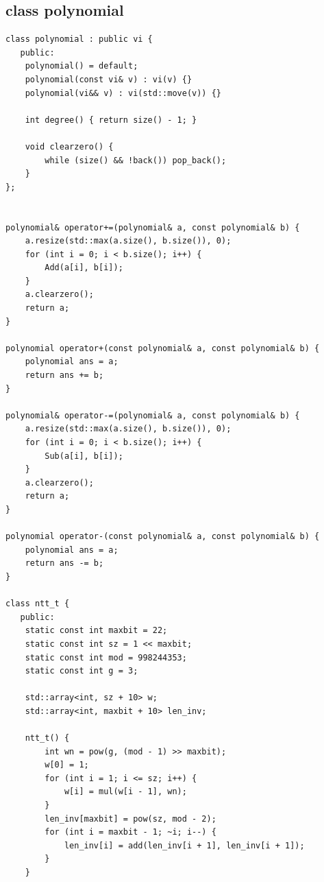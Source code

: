 \documentclass[UTF8, a4paper, titlepage, twoside]{ctexart}
\begin{document}
\subsection{ class polynomial }

\begin{lstlisting}[style=cpp]
class polynomial : public vi {
   public:
    polynomial() = default;
    polynomial(const vi& v) : vi(v) {}
    polynomial(vi&& v) : vi(std::move(v)) {}

    int degree() { return size() - 1; }

    void clearzero() {
        while (size() && !back()) pop_back();
    }
};


polynomial& operator+=(polynomial& a, const polynomial& b) {
    a.resize(std::max(a.size(), b.size()), 0);
    for (int i = 0; i < b.size(); i++) {
        Add(a[i], b[i]);
    }
    a.clearzero();
    return a;
}

polynomial operator+(const polynomial& a, const polynomial& b) {
    polynomial ans = a;
    return ans += b;
}

polynomial& operator-=(polynomial& a, const polynomial& b) {
    a.resize(std::max(a.size(), b.size()), 0);
    for (int i = 0; i < b.size(); i++) {
        Sub(a[i], b[i]);
    }
    a.clearzero();
    return a;
}

polynomial operator-(const polynomial& a, const polynomial& b) {
    polynomial ans = a;
    return ans -= b;
}

class ntt_t {
   public:
    static const int maxbit = 22;
    static const int sz = 1 << maxbit;
    static const int mod = 998244353;
    static const int g = 3;

    std::array<int, sz + 10> w;
    std::array<int, maxbit + 10> len_inv;

    ntt_t() {
        int wn = pow(g, (mod - 1) >> maxbit);
        w[0] = 1;
        for (int i = 1; i <= sz; i++) {
            w[i] = mul(w[i - 1], wn);
        }
        len_inv[maxbit] = pow(sz, mod - 2);
        for (int i = maxbit - 1; ~i; i--) {
            len_inv[i] = add(len_inv[i + 1], len_inv[i + 1]);
        }
    }


\end{lstlisting}
\end{document}
